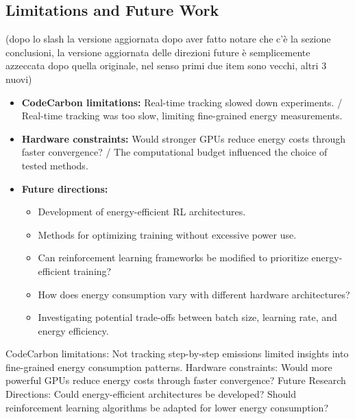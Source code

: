 \subsection{Limitations and Future Work}
(dopo lo slash la versione aggiornata dopo aver fatto notare che c'è la sezione conclusioni, la versione aggiornata delle direzioni future è semplicemente azzeccata dopo quella originale, nel senso primi due item sono vecchi, altri 3 nuovi)
\begin{itemize}
	\item \textbf{CodeCarbon limitations:} Real-time tracking slowed down experiments. / Real-time tracking was too slow, limiting fine-grained energy measurements.
	\item \textbf{Hardware constraints:} Would stronger GPUs reduce energy costs through faster convergence? / The computational budget influenced the choice of tested methods.
	\item \textbf{Future directions:}
	\begin{itemize}
		\item Development of energy-efficient RL architectures.
		\item Methods for optimizing training without excessive power use.
		\item Can reinforcement learning frameworks be modified to prioritize energy-efficient training?
		\item How does energy consumption vary with different hardware architectures?
		\item Investigating potential trade-offs between batch size, learning rate, and energy efficiency.
	\end{itemize}
\end{itemize}
CodeCarbon limitations: Not tracking step-by-step emissions limited insights into fine-grained energy consumption patterns.
Hardware constraints: Would more powerful GPUs reduce energy costs through faster convergence?
Future Research Directions:
Could energy-efficient architectures be developed?
Should reinforcement learning algorithms be adapted for lower energy consumption?